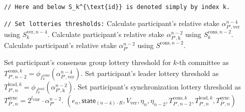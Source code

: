 \begin{protocol}
\begin{algorithmic}[1]
        \noindent
        \lstinline|// Here and below S_k^{\text{id}} is denoted simply by index k.|

        \noindent
        \lstinline|// Set lotteries thresholds:|
        \State Calculate participant's relative stake $\alpha^{n-4}_{P', \text{ver}}$ using $S_k^{\text{ver}, {n - 4}}$.
        \State Calculate participant's relative stake $\alpha^{n-2}_{P', \text{k}}$ using $S_k^{\text{cons}, {n - 2}}$.
        \State Calculate participant's relative stake $\alpha^{n-2}_{P'}$ using $S^{\text{cons}, {n - 2}}$.

        \State Set participant's consensus group lottery threshold for $k$-th committee as $T_{P', n-2}^{\text{cons}, k} = \phi_{f^{\text{cons}}_k}(\alpha^{n-4}_{P', \text{ver}})$.
        \State Set participant's leader lottery threshold as $T_{P', n}^{\text{lead}, k} = \phi_{f^{\text{lead}}_k}(\alpha^{n-2}_{P', \text{k}})$.
        \State Set participant's synchronization lottery threshold as $T_{P', n}^{\text{sync}} = 2^{l_{\text{VRF}}} \cdot \alpha^{n-2}_{P'}$.
        \State \Return ${(e_n, \textsf{state}_{(n - 4)\cdot R}, V_{\text{ver}}, \eta_{n}, \eta_{n - 2}, T_{P', n-2}^{\text{cons}, k}, T_{P', n}^{\text{lead}, k}, T_{P', n}^{\text{sync}})}$
    \end{algorithmic}\label{alg:prepare-block-validation}
\end{protocol}

